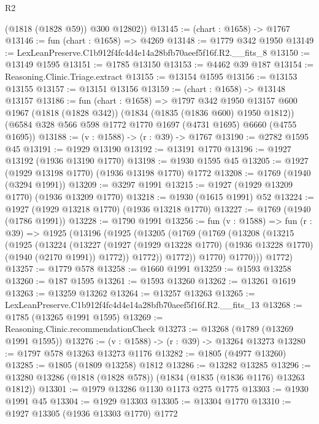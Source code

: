 \begin{lexlean}{R2}
\begin{coremodule}
        (@1818 (@1828 @59))
        @300
        @12802))
@13145 := (chart : @1658) -> @1767
@13146 := fun (chart : @1658) => @4269
@13148 := @1779 @342 @1950
@13149 := LexLeanPreserve.C1b912f4fc4d4e14a28bfb70aeef5f16f.R2.__fits_8
@13150 := @13149 @1595
@13151 := @1785 @13150
@13153 := @4462 @39 @187
@13154 := Reasoning.Clinic.Triage.extract
@13155 := @13154 @1595
@13156 := @13153 @13155
@13157 := @13151 @13156
@13159 := (chart : @1658) -> @13148 @13157
@13186 := fun (chart : @1658) =>
  @1797
    @342
    @1950
    @13157
    @600
    @1967
    (@1818 (@1828 @342))
    (@1834 (@1835 (@1836 @600) @1950 @1812))
    (@6584 @328 @566 @598 @1772 @1770 @1697 (@4731 @1695) @6660 (@4755 @1695))
@13188 := (v : @1588) -> (r : @39) -> @1767
@13190 := @2782 @1595 @45
@13191 := @1929 @13190
@13192 := @13191 @1770
@13196 := @1927 @13192 (@1936 @13190 @1770)
@13198 := @1930 @1595 @45
@13205 := @1927 (@1929 @13198 @1770) (@1936 @13198 @1770) @1772
@13208 := @1769 (@1940 (@3294 @1991))
@13209 := @3297 @1991
@13215 := @1927 (@1929 @13209 @1770) (@1936 @13209 @1770)
@13218 := @1930 (@1615 @1991) @52
@13224 := @1927 (@1929 @13218 @1770) (@1936 @13218 @1770)
@13227 := @1769 (@1940 (@1786 @1991))
@13228 := @1790 @1991
@13256 := fun (v : @1588) =>
  fun (r : @39) =>
  @1925
    (@13196
      (@1925
        (@13205
          (@1769
            (@1769
              (@13208
                (@13215
                  (@1925
                    (@13224
                      (@13227
                        (@1927
                          (@1929 @13228 @1770)
                          (@1936 @13228 @1770)
                          (@1940 (@2170 @1991))
                          @1772))
                      @1772))
                  @1772))
              @1770)
            @1770)))
      @1772)
@13257 := @1779 @578
@13258 := @1660 @1991
@13259 := @1593 @13258
@13260 := @187 @1595
@13261 := @1593 @13260
@13262 := @13261 @1619
@13263 := @13259 @13262
@13264 := @13257 @13263
@13265 := LexLeanPreserve.C1b912f4fc4d4e14a28bfb70aeef5f16f.R2.__fits_13
@13268 := @1785 (@13265 @1991 @1595)
@13269 := Reasoning.Clinic.recommendationCheck
@13273 := @13268 (@1789 (@13269 @1991 @1595))
@13276 := (v : @1588) -> (r : @39) -> @13264 @13273
@13280 := @1797 @578 @13263 @13273 @1176
@13282 := @1805 (@4977 @13260)
@13285 := @1805 (@1809 @13258) @1812
@13286 := @13282 @13285
@13296 := @13280 @13286 (@1818 (@1828 @578)) (@1834 (@1835 (@1836 @1176) @13263 @1812))
@13301 := @1979 @13286 @1130 @1173 @275 @1775
@13303 := @1930 @1991 @45
@13304 := @1929 @13303
@13305 := @13304 @1770
@13310 := @1927 @13305 (@1936 @13303 @1770) @1772

\end{coremodule}
\end{lexlean}
